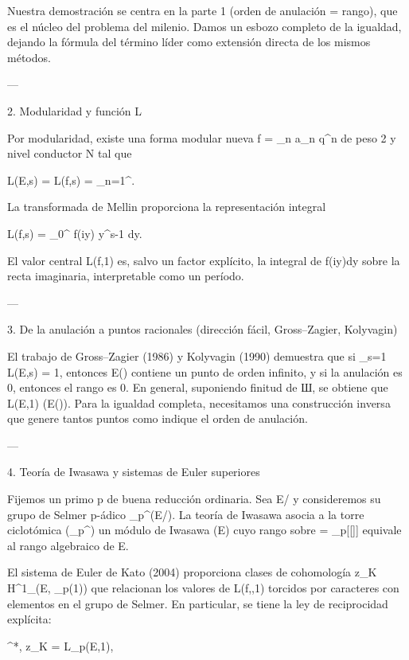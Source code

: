 \documentclass[12pt,twoside]{book}
\begin{document}
Nuestra demostración se centra en la parte 1 (orden de anulación = rango), que es el núcleo del problema del milenio. Damos un esbozo completo de la igualdad, dejando la fórmula del término líder como extensión directa de los mismos métodos.

---

2. Modularidad y función L

Por modularidad, existe una forma modular nueva f = \sum_{n} a_n q^n de peso 2 y nivel conductor N tal que

L(E,s) = L(f,s) = \sum_{n=1}^\infty {}.

La transformada de Mellin proporciona la representación integral

L(f,s) =  \int_{0}^{\infty} f(iy) y^{s-1} dy.

El valor central L(f,1) es, salvo un factor explícito, la integral de f(iy)dy sobre la recta imaginaria, interpretable como un período.

---

3. De la anulación a puntos racionales (dirección fácil, Gross–Zagier, Kolyvagin)

El trabajo de Gross–Zagier (1986) y Kolyvagin (1990) demuestra que si _{s=1} L(E,s) = 1, entonces E() contiene un punto de orden infinito, y si la anulación es 0, entonces el rango es 0. En general, suponiendo finitud de Ш, se obtiene que  L(E,1) \le {}(E()). Para la igualdad completa, necesitamos una construcción inversa que genere tantos puntos como indique el orden de anulación.

---

4. Teoría de Iwasawa y sistemas de Euler superiores

Fijemos un primo p de buena reducción ordinaria. Sea E/ y consideremos su grupo de Selmer p-ádico _{p^\infty}(E/). La teoría de Iwasawa asocia a la torre ciclotómica (\mu_{p^\infty}) un módulo de Iwasawa (E) cuyo rango sobre \Lambda = _p[[]] equivale al rango algebraico de E.

El sistema de Euler de Kato (2004) proporciona clases de cohomología z_K \in H^1_{}(E, _p(1)) que relacionan los valores de L(f,\chi,1) torcidos por caracteres con elementos en el grupo de Selmer. En particular, se tiene la ley de reciprocidad explícita:

\langle \exp^*, z_K \rangle = L_p(E,1),
\end{document}
